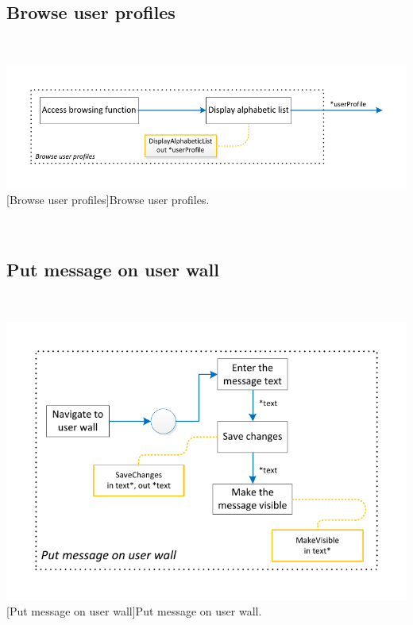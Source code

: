 \documentclass[11pt, a4paper,svglistings,oneside]{book}
\begin{document}
\subsection{Browse user profiles}

$\;$ \\
\noindent\begin{minipage}{\textwidth}
    \centering
   \includegraphics[scale=1]{nav_BrowseUserProfile.pdf}
 [Browse user profiles]{Browse user profiles.}
\end{minipage}
$\;$ \\ 


\subsection{Put message on user wall}

$\;$ \\
\noindent\begin{minipage}{\textwidth}
    \centering
   \includegraphics[scale=1]{nav_PutMessageOnUserWall.pdf}
 [Put message on user wall]{Put message on user wall.}
\end{minipage}
$\;$ \\ 
\end{document}
